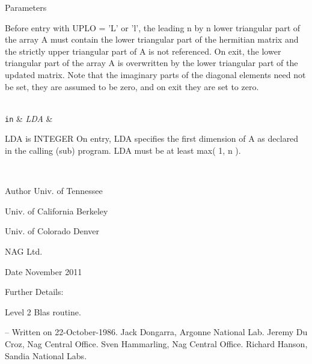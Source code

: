 \begin{DoxyParams}[1]{Parameters}
\begin{DoxyVerb}
           Before entry with UPLO = 'L' or 'l', the leading n by n
           lower triangular part of the array A must contain the lower
           triangular part of the hermitian matrix and the strictly
           upper triangular part of A is not referenced. On exit, the
           lower triangular part of the array A is overwritten by the
           lower triangular part of the updated matrix.
           Note that the imaginary parts of the diagonal elements need
           not be set, they are assumed to be zero, and on exit they
           are set to zero.\end{DoxyVerb}
\\
\hline
\mbox{\tt in}  & {\em L\+D\+A} & \begin{DoxyVerb}          LDA is INTEGER
           On entry, LDA specifies the first dimension of A as declared
           in the calling (sub) program. LDA must be at least
           max( 1, n ).\end{DoxyVerb}
 \\
\hline
\end{DoxyParams}
\begin{DoxyAuthor}{Author}
Univ. of Tennessee 

Univ. of California Berkeley 

Univ. of Colorado Denver 

N\+A\+G Ltd. 
\end{DoxyAuthor}
\begin{DoxyDate}{Date}
November 2011 
\end{DoxyDate}
\begin{DoxyParagraph}{Further Details\+: }
\begin{DoxyVerb}  Level 2 Blas routine.

  -- Written on 22-October-1986.
     Jack Dongarra, Argonne National Lab.
     Jeremy Du Croz, Nag Central Office.
     Sven Hammarling, Nag Central Office.
     Richard Hanson, Sandia National Labs.\end{DoxyVerb}
 
\end{DoxyParagraph}
\hypertarget{group__complex__blas__level2_gaa59d93fbbd8d0b1be4a51634cb437cc1}{}
